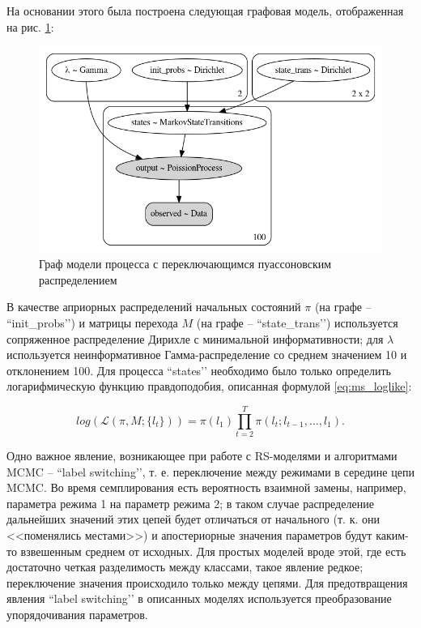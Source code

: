 \documentclass[a4paper,14pt]{extreport}
\begin{document}
На основании этого была построена следующая графовая модель, отображенная на рис. \ref{fig:pp_ms_pois_graph}:

\begin{figure}[H]
	\includegraphics[width=\linewidth]{img/gen/pp_ms_pois_graph.png}
	\caption{Граф модели процесса с переключающимся пуассоновским распределением}
	\label{fig:pp_ms_pois_graph}
\end{figure}

В качестве априорных распределений начальных состояний $\pi$ (на графе -- ``init\_probs’’) и матрицы перехода $M$ (на графе -- ``state\_trans’’) используется сопряженное распределение Дирихле с минимальной информативности; для $\lambda$ используется неинформативное Гамма-распределение со среднем значением 10 и отклонением 100. Для процесса ``states’’ необходимо было только определить логарифмическую функцию правдоподобия, описанная формулой \ref{eq:ms_loglike}:

\begin{equation}
	\label{eq:ms_loglike}
	\mathit{log}(\mathcal{L}(\pi, M; \{l_t\}))
	=
	\pi(l_1)
	\prod\limits_{t=2}^{T}{ 
	\pi(l_t; l_{t-1}, \dots, l_1)
	} .
\end{equation}

Одно важное явление, возникающее при работе с RS-моделями и алгоритмами MCMC – ``label switching’’, т. е. переключение между режимами в середине цепи MCMC. Во время семплирования есть вероятность взаимной замены, например, параметра режима 1 на параметр режима 2; в таком случае распределение дальнейших значений этих цепей будет отличаться от начального (т. к. они <<поменялись местами>>) и апостериорные значения параметров будут каким-то взвешенным среднем от исходных. Для простых моделей вроде этой, где есть достаточно четкая разделимость между классами, такое явление редкое; переключение значения происходило только между цепями. Для предотвращения явления ``label switching’’ в описанных моделях используется преобразование упорядочивания параметров.
\end{document}
